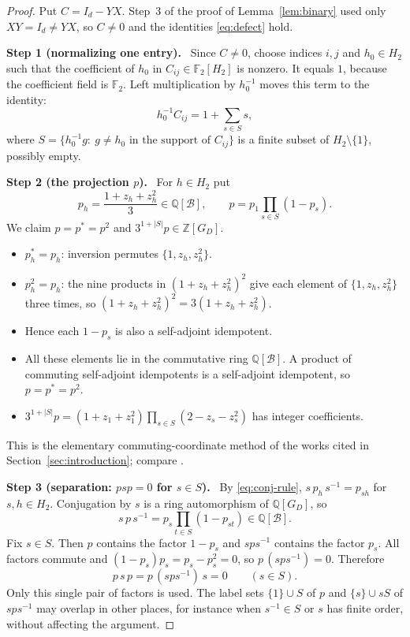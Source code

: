 \documentclass[11pt]{article}
\theoremstyle{remark}
\numberwithin{equation}{section}
\newcommand{\F}{\mathbb F}
\newcommand{\Z}{\mathbb Z}
\newcommand{\Q}{\mathbb Q}
\newcommand{\step}[1]{\par\smallskip\noindent\textbf{Step #1.}\ }
\begin{document}
\begin{proof}
Put $C=I_d-YX$. Step~3 of the proof of Lemma~\ref{lem:binary} used only $XY=I_d\neq YX$, so $C\ne0$ and the identities \eqref{eq:defect} hold.

\step{1 (normalizing one entry)}
Since $C\ne0$, choose indices $i,j$ and $h_0\in H_2$ such that the coefficient of $h_0$ in $C_{ij}\in\F_2[H_2]$ is nonzero. It equals $1$, because the coefficient field is $\F_2$. Left multiplication by $h_0^{-1}$ moves this term to the identity:
\begin{equation}\label{eq:support}
 h_0^{-1}C_{ij}=1+\sum_{s\in S}s,
\end{equation}
where $S=\{h_0^{-1}g:\ g\ne h_0\text{ in the support of }C_{ij}\}$ is a finite subset of $H_2\setminus\{1\}$, possibly empty.

\step{2 (the projection $p$)}
For $h\in H_2$ put
\[
 p_h=\frac{1+z_h+z_h^2}{3}\in\Q[\mathcal B],\qquad
 p=p_1\prod_{s\in S}(1-p_s).
\]
We claim $p=p^*=p^2$ and $3^{1+|S|}p\in\Z[G_D]$.
\begin{itemize}[leftmargin=2em]
\item $p_h^*=p_h$: inversion permutes $\{1,z_h,z_h^2\}$.
\item $p_h^2=p_h$: the nine products in $(1+z_h+z_h^2)^2$ give each element of $\{1,z_h,z_h^2\}$ three times, so $(1+z_h+z_h^2)^2=3(1+z_h+z_h^2)$.
\item Hence each $1-p_s$ is also a self-adjoint idempotent.
\item All these elements lie in the commutative ring $\Q[\mathcal B]$. A product of commuting self-adjoint idempotents is a self-adjoint idempotent, so $p=p^*=p^2$.
\item $3^{1+|S|}p=(1+z_1+z_1^2)\prod_{s\in S}(2-z_s-z_s^2)$ has integer coefficients.
\end{itemize}
This is the elementary commuting-coordinate method of the works cited in Section~\ref{sec:introduction}; compare \cite[Lemmas 3.1 and 3.4]{DicksSchick2002}.

\step{3 (separation: $psp=0$ for $s\in S$)}
By \eqref{eq:conj-rule}, $s\,p_h\,s^{-1}=p_{sh}$ for $s,h\in H_2$. Conjugation by $s$ is a ring automorphism of $\Q[G_D]$, so
\[
 s\,p\,s^{-1}=p_s\prod_{t\in S}(1-p_{st})\in\Q[\mathcal B].
\]
Fix $s\in S$. Then $p$ contains the factor $1-p_s$ and $sps^{-1}$ contains the factor $p_s$. All factors commute and $(1-p_s)p_s=p_s-p_s^2=0$, so $p\,(sps^{-1})=0$. Therefore
\begin{equation}\label{eq:separation}
 p\,s\,p=p\,(sps^{-1})\,s=0\qquad(s\in S).
\end{equation}
Only this single pair of factors is used. The label sets $\{1\}\cup S$ of $p$ and $\{s\}\cup sS$ of $sps^{-1}$ may overlap in other places, for instance when $s^{-1}\in S$ or $s$ has finite order, without affecting the argument.


\end{proof}
\end{document}
